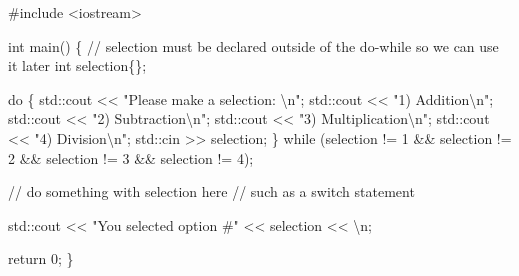 \documentclass[
  letterpaper,
  DIV=11,
  numbers=noendperiod]{scrreprt}
\newenvironment{Shaded}{\begin{snugshade}}{\end{snugshade}}
\newcommand{\CommentTok}[1]{\textcolor[rgb]{0.37,0.37,0.37}{#1}}
\newcommand{\ControlFlowTok}[1]{\textcolor[rgb]{0.00,0.23,0.31}{#1}}
\newcommand{\DecValTok}[1]{\textcolor[rgb]{0.68,0.00,0.00}{#1}}
\newcommand{\ErrorTok}[1]{\textcolor[rgb]{0.68,0.00,0.00}{#1}}
\newcommand{\FunctionTok}[1]{\textcolor[rgb]{0.28,0.35,0.67}{#1}}
\newcommand{\NormalTok}[1]{\textcolor[rgb]{0.00,0.23,0.31}{#1}}
\newcommand{\SpecialCharTok}[1]{\textcolor[rgb]{0.37,0.37,0.37}{#1}}
\newcommand{\StringTok}[1]{\textcolor[rgb]{0.13,0.47,0.30}{#1}}
\begin{document}
\begin{Shaded}
\begin{Highlighting}[]
\CommentTok{\#include \textless{}iostream\textgreater{}}

\NormalTok{int }\FunctionTok{main}\NormalTok{()}
\NormalTok{\{}
    \SpecialCharTok{/}\ErrorTok{/}\NormalTok{ selection must be declared outside of the do}\SpecialCharTok{{-}}\ControlFlowTok{while}\NormalTok{ so we can use it later}
\NormalTok{    int selection\{\};}

\NormalTok{    do}
\NormalTok{    \{}
\NormalTok{        std}\SpecialCharTok{::}\NormalTok{cout }\SpecialCharTok{\textless{}}\ErrorTok{\textless{}} \StringTok{"Please make a selection: }\SpecialCharTok{\textbackslash{}n}\StringTok{"}\NormalTok{;}
\NormalTok{        std}\SpecialCharTok{::}\NormalTok{cout }\SpecialCharTok{\textless{}}\ErrorTok{\textless{}} \StringTok{"1) Addition}\SpecialCharTok{\textbackslash{}n}\StringTok{"}\NormalTok{;}
\NormalTok{        std}\SpecialCharTok{::}\NormalTok{cout }\SpecialCharTok{\textless{}}\ErrorTok{\textless{}} \StringTok{"2) Subtraction}\SpecialCharTok{\textbackslash{}n}\StringTok{"}\NormalTok{;}
\NormalTok{        std}\SpecialCharTok{::}\NormalTok{cout }\SpecialCharTok{\textless{}}\ErrorTok{\textless{}} \StringTok{"3) Multiplication}\SpecialCharTok{\textbackslash{}n}\StringTok{"}\NormalTok{;}
\NormalTok{        std}\SpecialCharTok{::}\NormalTok{cout }\SpecialCharTok{\textless{}}\ErrorTok{\textless{}} \StringTok{"4) Division}\SpecialCharTok{\textbackslash{}n}\StringTok{"}\NormalTok{;}
\NormalTok{        std}\SpecialCharTok{::}\NormalTok{cin }\SpecialCharTok{\textgreater{}}\ErrorTok{\textgreater{}}\NormalTok{ selection;}
\NormalTok{    \}}
    \ControlFlowTok{while}\NormalTok{ (selection }\SpecialCharTok{!=} \DecValTok{1} \SpecialCharTok{\&\&}\NormalTok{ selection }\SpecialCharTok{!=} \DecValTok{2} \SpecialCharTok{\&\&}
\NormalTok{        selection }\SpecialCharTok{!=} \DecValTok{3} \SpecialCharTok{\&\&}\NormalTok{ selection }\SpecialCharTok{!=} \DecValTok{4}\NormalTok{);}

    \SpecialCharTok{/}\ErrorTok{/}\NormalTok{ do something with selection here}
    \SpecialCharTok{/}\ErrorTok{/}\NormalTok{ such as a }\ControlFlowTok{switch}\NormalTok{ statement}

\NormalTok{    std}\SpecialCharTok{::}\NormalTok{cout }\SpecialCharTok{\textless{}}\ErrorTok{\textless{}} \StringTok{"You selected option \#"} \SpecialCharTok{\textless{}}\ErrorTok{\textless{}}\NormalTok{ selection }\SpecialCharTok{\textless{}}\ErrorTok{\textless{}} \StringTok{\textquotesingle{}}\SpecialCharTok{\textbackslash{}n}\StringTok{\textquotesingle{}}\NormalTok{;}

\NormalTok{    return }\DecValTok{0}\NormalTok{;}
\NormalTok{\}}
\end{Highlighting}
\end{Shaded}
\end{document}
